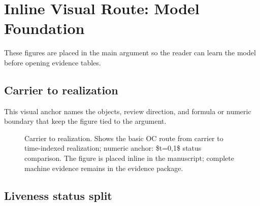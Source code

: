 \section{Inline Visual Route: Model Foundation}

These figures are placed in the main argument so the reader can learn the model before opening evidence tables.


\subsection{Carrier to realization}

This visual anchor names the objects, review direction, and formula or numeric boundary that keep the figure tied to the argument.


\begin{figure}[htbp]

\centering


\caption{Carrier to realization. Shows the basic OC route from carrier to time-indexed realization; numeric anchor: \$t=0,1\$ status comparison. The figure is placed inline in the manuscript; complete machine evidence remains in the evidence package.}

\label{fig:r005-inline-28a_oc133_inline_figures_foundation-1}

\end{figure}

\subsection{Liveness status split}

